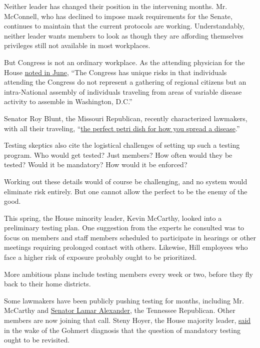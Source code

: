 Neither leader has changed their position in the intervening months. Mr.
McConnell, who has declined to impose mask requirements for the Senate,
continues to maintain that the current protocols are working.
Understandably, neither leader wants members to look as though they are
affording themselves privileges still not available in most workplaces.

But Congress is not an ordinary workplace. As the attending physician
for the House
\href{https://www.rollcall.com/2020/06/17/face-masks-required-in-house-committee-hearings-congressional-physician-says/}{noted
in June}, ``The Congress has unique risks in that individuals attending
the Congress do not represent a gathering of regional citizens but an
intra-National assembly of individuals traveling from areas of variable
disease activity to assemble in Washington, D.C.''

Senator Roy Blunt, the Missouri Republican, recently characterized
lawmakers, with all their traveling,
``\href{https://www.nytimes.com/2020/07/29/us/politics/louie-gohmert-positive-coronavirus-mask.html}{the
perfect petri dish for how you spread a disease}.''

Testing skeptics also cite the logistical challenges of setting up such
a testing program. Who would get tested? Just members? How often would
they be tested? Would it be mandatory? How would it be enforced?

Working out these details would of course be challenging, and no system
would eliminate risk entirely. But one cannot allow the perfect to be
the enemy of the good.

This spring, the House minority leader, Kevin McCarthy, looked into a
preliminary testing plan. One suggestion from the experts he consulted
was to focus on members and staff members scheduled to participate in
hearings or other meetings requiring prolonged contact with others.
Likewise, Hill employees who face a higher risk of exposure probably
ought to be prioritized.

More ambitious plans include testing members every week or two, before
they fly back to their home districts.

Some lawmakers have been publicly pushing testing for months, including
Mr. McCarthy and
\href{https://www.timesfreepress.com/news/local/story/2020/may/06/sen-alexander-congressional-leaders-should-ta/522336/}{Senator
Lamar Alexander}, the Tennessee Republican. Other members are now
joining that call. Steny Hoyer, the House majority leader,
\href{https://www.rollcall.com/2020/07/29/louie-gohmert-coronavirus-capitol/}{said}
in the wake of the Gohmert diagnosis that the question of mandatory
testing ought to be revisited.

